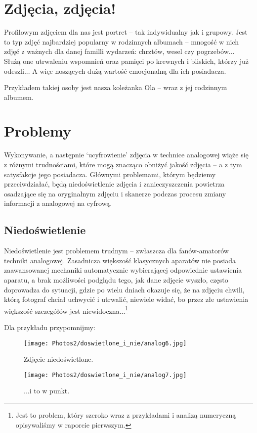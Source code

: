 \documentclass[]{mwart}
\begin{document}
\section{Zdjęcia, zdjęcia!}
Profilowym zdjęciem dla nas jest portret -- tak indywidualny jak i grupowy.
Jest to typ zdjęć najbardziej popularny w rodzinnych albumach -- mnogość w nich zdjęć z ważnych
dla danej familli wydarzeń: chrztów, wesel czy pogrzebów... Służą one utrwaleniu wspomnień oraz pamięci
po krewnych i bliskich, którzy już odeszli... A więc noszących dużą wartość emocjonalną dla ich posiadacza.

Przykładem takiej osoby jest nasza koleżanka Ola -- wraz z jej rodzinnym albumem.

\section{Problemy}
Wykonywanie, a następnie `ucyfrowienie' zdjęcia w technice analogowej wiąże się z różnymi trudnościami,
które mogą znacząco obniżyć jakość zdjęcia -- a z tym satysfakcje jego posiadacza. Głównymi problemami,
którym będziemy przeciwdziałać, będą niedoświetlenie zdjęcia i zanieczyszczenia powietrza osadzające
się na oryginalnym zdjęciu i skanerze podczas procesu zmiany informacji z analogowej na cyfrową.

\subsection{Niedoświetlenie} %
Niedoświetlenie jest problemem trudnym -- zwłaszcza dla fanów-amatorów techniki analogowej.
Zasadnicza większość klasycznych aparatów nie posiada zaawansowanej mechaniki automatycznie wybierającej
odpowiednie ustawienia aparatu, a brak możliwości podglądu tego, jak dane zdjęcie wyszło, często doprowadza
do sytuacji, gdzie po wielu dniach okazuje się, że na zdjęciu chwili, którą fotograf chciał uchwycić i utrwalić,
niewiele widać, bo przez złe ustawienia większość szczegółów jest niewidoczna...\footnote{Jest to problem, który szeroko
    wraz z przykładami i analizą numeryczną opisywaliśmy w raporcie pierwszym.}

Dla przykładu przypomnijmy:
\newpage
\begin{figure}[H]
    \centering
    \texttt{[image: Photos2/doswietlone\_i\_nie/analog6.jpg]}
    \caption{Zdjęcie niedoświetlone.}
\end{figure}
\begin{figure}[H]
    \centering
    \texttt{[image: Photos2/doswietlone\_i\_nie/analog7.jpg]}
    \caption{...i to w punkt.}
\end{figure}
\end{document}
